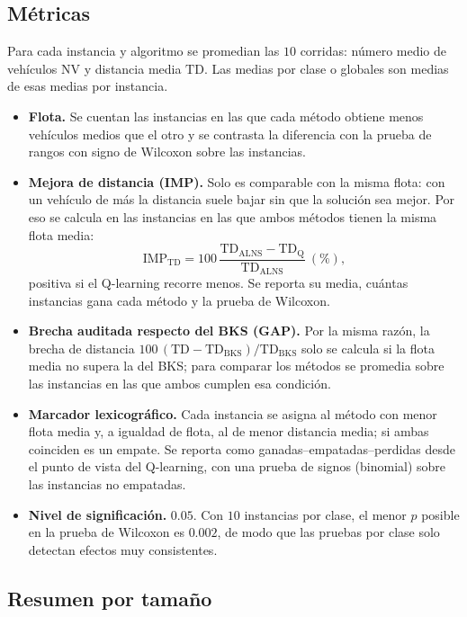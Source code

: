 \subsection{Métricas}
\label{sec:exp-metricas}

Para cada instancia y algoritmo se promedian las $10$ corridas: número medio de vehículos
$\mathrm{NV}$ y distancia media $\mathrm{TD}$. Las medias por clase o globales son medias de
esas medias por instancia.

\begin{itemize}
\item \textbf{Flota.} Se cuentan las instancias en las que cada método obtiene menos
vehículos medios que el otro y se contrasta la diferencia con la prueba de rangos con signo
de Wilcoxon sobre las instancias.
\item \textbf{Mejora de distancia (IMP).} Solo es comparable con la misma flota: con un
vehículo de más la distancia suele bajar sin que la solución sea mejor. Por eso se calcula en
las instancias en las que ambos métodos tienen la misma flota media:
\[
\mathrm{IMP}_{\mathrm{TD}}=100\,\frac{\mathrm{TD}_{\mathrm{ALNS}}-\mathrm{TD}_{\mathrm{Q}}}{\mathrm{TD}_{\mathrm{ALNS}}}\ (\%),
\]
positiva si el Q-learning recorre menos. Se reporta su media, cuántas instancias gana cada
método y la prueba de Wilcoxon.
\item \textbf{Brecha auditada respecto del BKS (GAP).} Por la misma razón, la brecha de
distancia $100\,(\mathrm{TD}-\mathrm{TD}_{\mathrm{BKS}})/\mathrm{TD}_{\mathrm{BKS}}$ solo se
calcula si la flota media no supera la del BKS; para comparar los métodos se promedia sobre
las instancias en las que ambos cumplen esa condición.
\item \textbf{Marcador lexicográfico.} Cada instancia se asigna al método con menor flota
media y, a igualdad de flota, al de menor distancia media; si ambas coinciden es un empate. Se
reporta como ganadas--empatadas--perdidas desde el punto de vista del Q-learning, con una
prueba de signos (binomial) sobre las instancias no empatadas.
\item \textbf{Nivel de significación.} $0.05$. Con $10$ instancias por clase, el menor
$p$ posible en la prueba de Wilcoxon es $0.002$, de modo que las pruebas por clase solo
detectan efectos muy consistentes.
\end{itemize}

\subsection{Resumen por tamaño}
\label{sec:exp-resumen}

